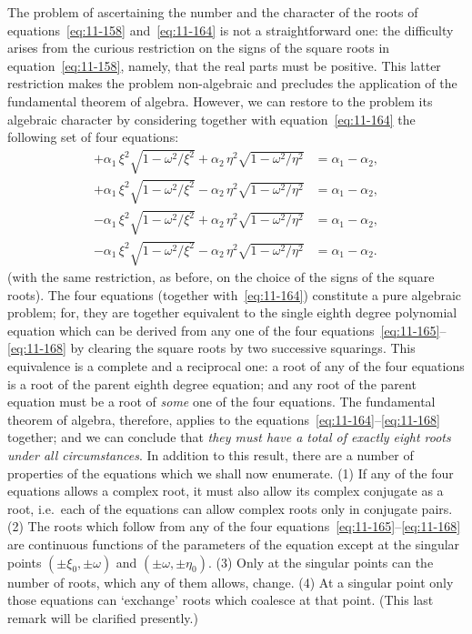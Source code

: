 The problem of ascertaining the number and the character of the roots of equations~\eqref{eq:11-158} and~\eqref{eq:11-164} is not a straightforward one: the difficulty arises from the curious restriction on the signs of the square roots in equation~\eqref{eq:11-158}, namely, that the real parts must be positive. This latter restriction makes the problem non-algebraic and precludes the application of the fundamental theorem of algebra. However, we can restore to the problem its algebraic character by considering together with equation~\eqref{eq:11-164} the following set of four equations:
\begin{align}
\label{eq:11-165}
+\alpha_1\,\xi^2\!\sqrt{1-\omega^2/\xi^2}+\alpha_2\,\eta^2\!\sqrt{1-\omega^2/\eta^2} &= \alpha_1-\alpha_2, \\
\label{eq:11-166}
+\alpha_1\,\xi^2\!\sqrt{1-\omega^2/\xi^2}-\alpha_2\,\eta^2\!\sqrt{1-\omega^2/\eta^2} &= \alpha_1-\alpha_2, \\
\label{eq:11-167}
-\alpha_1\,\xi^2\!\sqrt{1-\omega^2/\xi^2}+\alpha_2\,\eta^2\!\sqrt{1-\omega^2/\eta^2} &= \alpha_1-\alpha_2, \\
\label{eq:11-168}
-\alpha_1\,\xi^2\!\sqrt{1-\omega^2/\xi^2}-\alpha_2\,\eta^2\!\sqrt{1-\omega^2/\eta^2} &= \alpha_1-\alpha_2.
\end{align}
(with the same restriction, as before, on the choice of the signs of the square roots). The four equations (together with~\eqref{eq:11-164}) constitute a pure algebraic problem; for, they are together equivalent to the single eighth degree polynomial equation which can be derived from any one of the four equations~\eqref{eq:11-165}--\eqref{eq:11-168} by clearing the square roots by two successive squarings. This equivalence is a complete and a reciprocal one: a root of any of the four equations is a root of the parent eighth degree equation; and any root of the parent equation must be a root of \textit{some} one of the four equations. The fundamental theorem of algebra, therefore, applies to the equations~\eqref{eq:11-164}--\eqref{eq:11-168} together; and we can conclude that \textit{they must have a total of exactly eight roots under all circumstances}. In addition to this result, there are a number of properties of the equations which we shall now enumerate. (1) If any of the four equations allows a complex root, it must also allow its complex conjugate as a root, i.e.\ each of the equations can allow complex roots only in conjugate pairs. (2) The roots which follow from any of the four equations~\eqref{eq:11-165}--\eqref{eq:11-168} are continuous functions of the parameters of the equation except at the singular points $(\pm\xi_0, \pm\omega)$ and $(\pm\omega, \pm\eta_0)$. (3) Only at the singular points can the number of roots, which any of them allows, change. (4) At a singular point only those equations can `exchange' roots which coalesce at that point. (This last remark will be clarified presently.)

